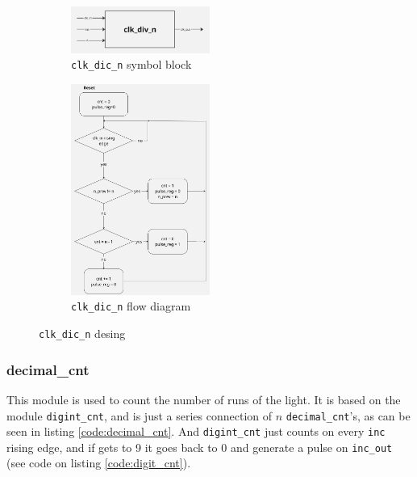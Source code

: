 \documentclass[12pt]{article}   	%
\begin{document}
\begin{figure}[htb]
    \centering
    \begin{subfigure}[t]{0.9\textwidth}
        \centering
\includegraphics[width=0.5\textwidth]{img/clk_div_n_sym}
        \caption{\lstinline|clk_dic_n| symbol block}
        \label{fig:clk_div_n_sym}
    \end{subfigure}%
    \hfill
    \begin{subfigure}[t]{0.9\textwidth}
        \centering
\includegraphics[width=0.5\textwidth]{img/clk_div_n_diag}
        \caption{\lstinline|clk_dic_n| flow diagram}
        \label{fig:clk_div_n_diag}
    \end{subfigure}
    \caption{\lstinline|clk_dic_n| desing}
    \label{fig:clk_div_n_figs}
\end{figure}




\subsubsection{decimal\_cnt}

This module is used to count the number of runs of the light. It is based on the module \lstinline|digint_cnt|, and is just a series connection of $n$ \lstinline|decimal_cnt|'s, as can be seen in listing \ref{code:decimal_cnt}. And \lstinline|digint_cnt| just counts on every \lstinline|inc| rising edge, and if gets to 9 it goes back to 0 and generate a pulse on \lstinline|inc_out| (see code on listing \ref{code:digit_cnt}).
\end{document}
